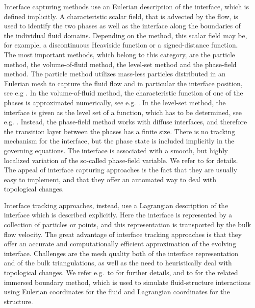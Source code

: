 \documentclass[a4paper,12pt,onecolumn]{article}
\begin{document}
Interface capturing methods use an Eulerian description of the interface, which
is defined implicitly. A characteristic scalar field,
that is advected by the flow, is used to identify
the two phases as well as the interface along the boundaries of the individual
fluid domains. Depending on the method, this scalar field may be, for example,
a discontinuous Heaviside function or a signed-distance function. The most
important methods, which belong to this category, are the particle method,
the volume-of-fluid method, the level-set method and the phase-field method.
The particle method utilizes mass-less particles distributed in an Eulerian
mesh to capture the fluid flow and in particular the interface position, see
e.g \cite{Girault1976}. In the volume-of-fluid method, the characteristic
function of one of the phases is approximated numerically, see e.g.
\cite{HirtN81,RenardyR02,Popinet09}. In the level-set method, the interface is
given as the level set of a function, which has to be determined, see e.g.
\cite{SussmanSO94,Sethian99,OsherF03,GrossR07,GrossR11,Svacek17}. Instead, the
phase-field method works with diffuse interfaces, and therefore the transition
layer between the phases has a finite size. There is no tracking mechanism for
the interface, but the phase state is included implicitly in the governing
equations. The interface is associated with a smooth, but highly localized
variation of the so-called phase-field variable. We refer to
\cite{HohenbergH77,AndersonMW98,LowengrubT98,Feng06,KaySW08,AbelsGG12,GrunK14}
for details.
The appeal of interface capturing approaches is the fact that they are usually
easy to implement, and that they offer an automated way to deal with
topological changes.

Interface tracking approaches, instead, use a Lagrangian description of the
interface which is described explicitly. Here the interface is represented
by a collection of particles or points, and this representation is
transported by the bulk flow velocity.
The great
advantage of interface tracking approaches is that they offer an accurate and
computationally efficient approximation of the evolving interface.
Challenges are the mesh quality both of the interface representation and of the
bulk triangulations, as well as the need to heuristically deal with topological
changes.
We refer e.g.\ to
\cite{UnverdiT92,Bansch01,Tryggvason_etal01,GanesanT08,spurious,
fluidfbp} for further details, and to \cite{LevequeL97,Peskin02} for the
related immersed boundary method, which is used to simulate fluid-structure
interactions using Eulerian coordinates for the fluid and Lagrangian
coordinates for the structure.
\end{document}

